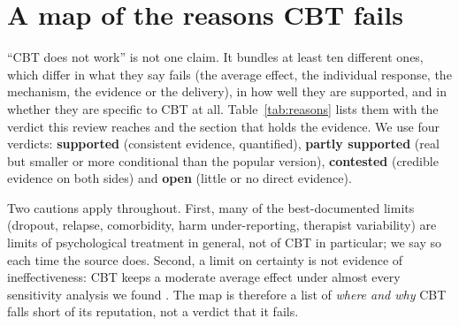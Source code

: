 \section{A map of the reasons CBT fails}\label{sec:taxonomy}
``CBT does not work'' is not one claim.
It bundles at least ten different ones, which differ in what they say fails (the average effect, the individual response, the mechanism, the evidence or the delivery), in how well they are supported, and in whether they are specific to CBT at all.
Table~\ref{tab:reasons} lists them with the verdict this review reaches and the section that holds the evidence.
We use four verdicts: \textbf{supported} (consistent evidence, quantified), \textbf{partly supported} (real but smaller or more conditional than the popular version), \textbf{contested} (credible evidence on both sides) and \textbf{open} (little or no direct evidence).

Two cautions apply throughout.
First, many of the best-documented limits (dropout, relapse, comorbidity, harm under-reporting, therapist variability) are limits of psychological treatment in general, not of CBT in particular; we say so each time the source does.
Second, a limit on certainty is not evidence of ineffectiveness: CBT keeps a moderate average effect under almost every sensitivity analysis we found \citep{plessen2023multiverse,carpenter2018cbt}.
The map is therefore a list of \emph{where and why} CBT falls short of its reputation, not a verdict that it fails.

